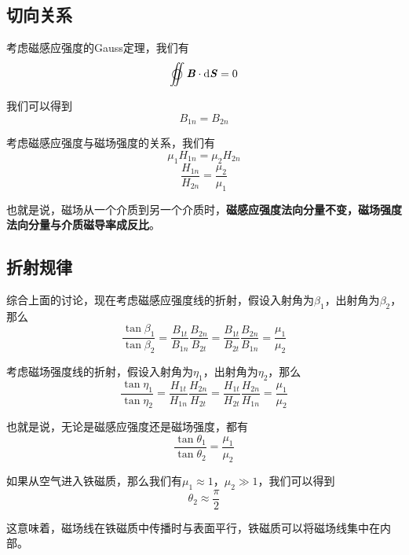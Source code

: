 \documentclass[UTF8,openany]{book}
\begin{document}
	\subsection{切向关系}
	\par 考虑磁感应强度的Gauss定理，我们有
	$$\varoiint\textbf{\textit{B}}\cdot\mathrm{d}\textbf{\textit{S}}=0$$
	\par 我们可以得到
	$$B_{1n}=B_{2n}$$
	\par 考虑磁感应强度与磁场强度的关系，我们有
	$$\mu_1H_{1n}=\mu_2H_{2n}$$
	$$\frac{H_{1n}}{H_{2n}}=\frac{\mu_2}{\mu_1}$$
	\par 也就是说，磁场从一个介质到另一个介质时，\textbf{磁感应强度法向分量不变，磁场强度法向分量与介质磁导率成反比}。
	\subsection{折射规律}
	\par 综合上面的讨论，现在考虑磁感应强度线的折射，假设入射角为$\beta_1$，出射角为$\beta_2$，那么
	$$\frac{\tan\beta_1}{\tan\beta_2}=\frac{B_{1t}}{B_{1n}}\frac{B_{2n}}{B_{2t}}=\frac{B_{1t}}{B_{2t}}\frac{B_{2n}}{B_{1n}}=\frac{\mu_1}{\mu_2}$$
	\par 考虑磁场强度线的折射，假设入射角为$\eta_1$，出射角为$\eta_2$，那么
	$$\frac{\tan\eta_1}{\tan\eta_2}=\frac{H_{1t}}{H_{1n}}\frac{H_{2n}}{H_{2t}}=\frac{H_{1t}}{H_{2t}}\frac{H_{2n}}{H_{1n}}=\frac{\mu_1}{\mu_2}$$
	\par 也就是说，无论是磁感应强度还是磁场强度，都有
	$$\frac{\tan\theta_1}{\tan\theta_2}=\frac{\mu_1}{\mu_2}$$
	\par 如果从空气进入铁磁质，那么我们有$\mu_1\approx1$，$\mu_2\gg1$，我们可以得到
	$$\theta_2\approx\frac{\pi}{2}$$
	\par 这意味着，磁场线在铁磁质中传播时与表面平行，铁磁质可以将磁场线集中在内部。
\end{document}
